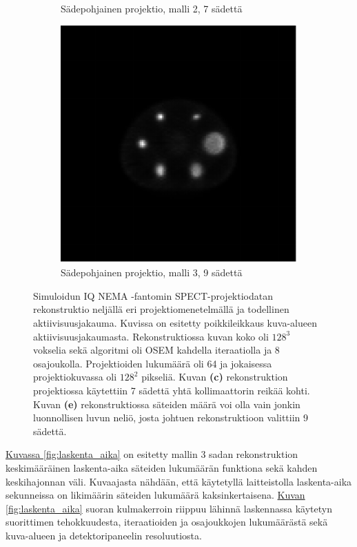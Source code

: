 \begin{figure}[H]
\begin{subfigure}[b]{.25\textwidth}
        \caption{Sädepohjainen projektio, malli 2, 7 sädettä}
    \end{subfigure}%
    \hspace{.075\textwidth}%
    \begin{subfigure}[b]{.25\textwidth}
        \includegraphics[width=\linewidth]{kuvat/rekonstruktio_proj1_malli3_nRay7.pdf}
        \caption{Sädepohjainen projektio, malli 3, 9 sädettä}
    \end{subfigure}
    \caption{Simuloidun IQ NEMA -fantomin SPECT-projektiodatan rekonstruktio neljällä eri projektiomenetelmällä ja todellinen aktiivisuusjakauma. Kuvissa on esitetty poikkileikkaus kuva-alueen aktiivisuusjakaumasta. Rekonstruktiossa kuvan koko oli $128^3$ vokselia sekä algoritmi oli OSEM kahdella iteraatiolla ja 8 osajoukolla. Projektioiden lukumäärä oli 64 ja jokaisessa projektiokuvassa oli $128^2$ pikseliä. Kuvan \textbf{(c)} rekonstruktion projektiossa käytettiin 7 sädettä yhtä kollimaattorin reikää kohti. Kuvan \textbf{(e)} rekonstruktiossa säteiden määrä voi olla vain jonkin luonnollisen luvun neliö, josta johtuen rekonstruktioon valittiin 9 sädettä.}
    \label{fig:rekonstruktiot}
\end{figure}

\hyperref[fig:laskenta_aika]{Kuvassa \ref*{fig:laskenta_aika}} on esitetty mallin 3 sadan rekonstruktion keskimääräinen laskenta-aika säteiden lukumäärän funktiona sekä kahden keskihajonnan väli. Kuvaajasta nähdään, että käytetyllä laitteistolla laskenta-aika sekunneissa on likimäärin säteiden lukumäärä kaksinkertaisena. \hyperref[fig:laskenta_aika]{Kuvan \ref*{fig:laskenta_aika}} suoran kulmakerroin riippuu lähinnä laskennassa käytetyn suorittimen tehokkuudesta, iteraatioiden ja osajoukkojen lukumäärästä sekä kuva-alueen ja detektoripaneelin resoluutiosta.

